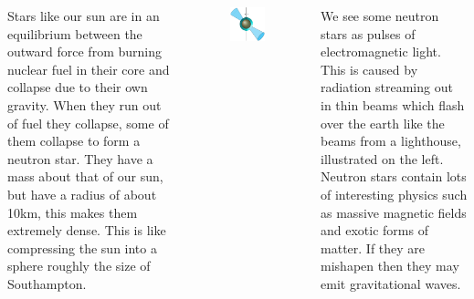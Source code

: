 \documentclass[20pt, a1paper, portrait, margin=10mm, innermargin=10mm,
    titleinnersep=8mm,titletoblockverticalspace=10mm,blocktitleinnersep=8mm,
    blocktitlewidthratio=08, blocktitlemaxwidth=25cm ,blockbodyinnersep=8mm,
    blockverticalspace=10mm,colspace=5mm, subcolspace=0mm,noteinnersep=3mm]
    {tikzposter}
\begin{document}
\begin{columns}
{Stars like our sun are in an equilibrium between the outward force from burning
nuclear fuel in their core and collapse due to their own gravity.  When they
run out of fuel they collapse, some of them collapse to form a neutron star.
They have a mass about that of our sun, but have a radius of about 10km, this
makes them extremely dense. This is like compressing the sun into a sphere
roughly the size of Southampton.
\vspace{4mm}
\begin{figure}
    \vspace{-5mm}
\begin{tikzfigure}
\centering
\includegraphics[width=\linewidth]{img/star-crop}
\end{tikzfigure}
\end{figure}

We see some neutron stars as pulses of electromagnetic light. This is caused by
radiation streaming out in thin beams which flash over the earth like the
beams from a lighthouse, illustrated on the left.
Neutron stars contain lots of interesting physics such as massive magnetic
fields and exotic forms of matter. If they are mishapen then they may
emit gravitational waves. 
\vspace{10mm}
}

\end{columns}
\end{document}
